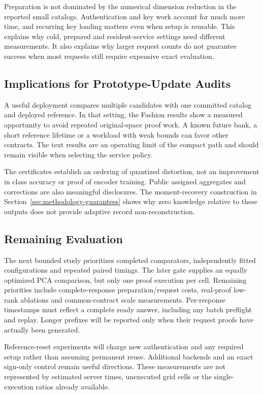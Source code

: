 Preparation is not dominated by the numerical dimension reduction in the
reported small catalogs. Authentication and key work account for much more
time, and recurring key loading matters even when setup is reusable. This
explains why cold, prepared and resident-service settings need different
measurements. It also explains why larger request counts do not guarantee
success when most requests still require expensive exact evaluation.

\subsection{Implications for Prototype-Update Audits}
A useful deployment compares multiple candidates with one committed catalog
and deployed reference. In that setting, the Fashion results show a measured
opportunity to avoid repeated original-space proof work. A known future
bank, a short reference lifetime or a workload with weak bounds can favor
other contracts. The text results are an operating limit of the compact
path and should remain visible when selecting the service policy.

The certificates establish an ordering of quantized distortion, not an
improvement in class accuracy or proof of encoder training. Public assigned
aggregates and corrections are also meaningful disclosures. The
moment-recovery construction in Section~\ref{sec:methodology-guarantees}
shows why zero knowledge relative to these outputs does not provide
adaptive record non-reconstruction.

\subsection{Remaining Evaluation}
The next bounded study prioritizes completed comparators, independently
fitted configurations and repeated paired timings. The later gate supplies
an equally optimized PCA comparison, but only one proof execution per cell.
Remaining priorities include complete-response preparation/request costs,
real-proof low-rank ablations and common-contract scale measurements.
Per-response timestamps must reflect a complete ready
answer, including any batch preflight and replay. Longer prefixes will be
reported only when their request proofs have actually been generated.

Reference-reset experiments will charge new authentication and any required
setup rather than assuming permanent reuse. Additional backends and an
exact sign-only control remain useful directions. These measurements are
not represented by estimated server times, unexecuted grid cells or the
single-execution ratios already available.

